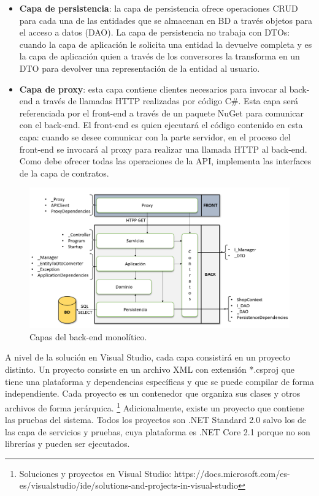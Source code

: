 \documentclass[11pt,spanish,listoffigures]{tfgetsinf}
\begin{document}
\begin{itemize}
\item \textbf{Capa de persistencia}: la capa de persistencia ofrece operaciones CRUD para cada una de las entidades que se almacenan en BD a través objetos para el acceso a datos (DAO). La capa de persistencia no trabaja con DTOs: cuando la capa de aplicación le solicita una entidad la devuelve completa y es la capa de aplicación quien a través de los conversores la transforma en un DTO para devolver una representación de la entidad al usuario.

\item \textbf{Capa de proxy}: esta capa contiene clientes necesarios para invocar al back-end a través de llamadas HTTP realizadas por código C\#. Esta capa será referenciada por el front-end a través de un paquete NuGet para comunicar con el back-end. El front-end es quien ejecutará el código contenido en esta capa: cuando se desee comunicar con la parte servidor, en el proceso del front-end se invocará al proxy para realizar una llamada HTTP al back-end. Como debe ofrecer todas las operaciones de la API, implementa las interfaces de la capa de contratos.

\end{itemize}

\begin{figure}[h]
\centering
\includegraphics[scale=0.5]{capas}
\caption{Capas del back-end monolítico.}
\end{figure}

A nivel de la solución en Visual Studio, cada capa consistirá en un proyecto distinto. Un proyecto consiste en un archivo XML con extensión *.csproj que tiene una plataforma y dependencias específicas y que se puede compilar de forma independiente. Cada proyecto es un contenedor que organiza sus clases y otros archivos de forma jerárquica. \footnote{ Soluciones y proyectos en Visual Studio: https://docs.microsoft.com/es-es/visualstudio/ide/solutions-and-projects-in-visual-studio} Adicionalmente, existe un proyecto que contiene las pruebas del sistema. Todos los proyectos son .NET Standard 2.0 salvo los de las capa de servicios y pruebas, cuya plataforma es .NET Core 2.1 porque no son librerías y pueden ser ejecutados.
\end{document}
